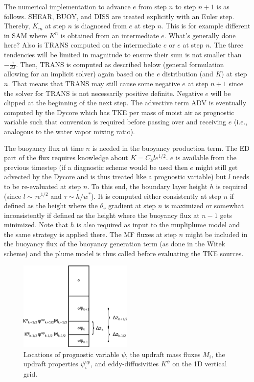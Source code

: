 \documentclass[dvipdfmx,a4paper,10pt]{article}
\begin{document}
The numerical implementation to advance $e$ from step $n$ to step $n+1$ is as follows. SHEAR, BUOY, and DISS are treated explicitly with an Euler step. Thereby, $K_m$ at step $n$ is diagnosed from $e$ at step $n$. {\color{blue} This is for example different in SAM where $K^n$ is obtained from an intermediate $e$. What's generally done here? Also is TRANS computed on the intermediate $e$ or $e$ at step $n$.} The three tendencies will be limited in magnitude to ensure their sum is not smaller than $-\frac{e}{\Delta t}$. Then, TRANS is computed as described below (general formulation allowing for an implicit solver) again based on the $e$ distribution (and $K$) at step $n$. That means that TRANS may still cause some negative $e$ at step $n+1$ since the solver for TRANS is not necessarily positive definite. Negative $e$ will be clipped at the beginning of the next step.  The advective term ADV is eventually computed by the Dycore which has TKE per mass of moist air as prognostic variable such that conversion is required before passing over and receiving $e$ (i.e., analogous to the water vapor mixing ratio). 

The buoyancy flux at time $n$ is needed in the buoyancy production term. The ED part of the flux requires knowledge about $K=C_k l e^{1/2}$. $e$ is available from the previous timestep (if a diagnostic scheme would be used then $e$ might still get advected by the Dycore and is thus treated like a prognostic variable) but $l$ needs to be re-evaluated at step $n$. To this end, the boundary layer height $h$ is required (since $l\sim \tau e^{1/2}$ and $\tau \sim h/w^*$). It is computed either consistently at step $n$ if defined as the height where the $\theta_v$ gradient at step $n$ is maximized or somewhat inconsistently if defined as the height where the buoyancy flux at $n-1$ gets minimized.  Note that $h$ is also required as input to the mupliplume model and the same strategy is applied there. The MF fluxes at step $n$ might be included in the buoyancy flux of the buoyancy generation term (as done in the Witek scheme) and the plume model is thus called before evaluating the TKE sources.


\begin{figure}[bthp]
\centering
 \includegraphics[width=0.5\textwidth]{staggering.eps}
\caption{Locations of prognostic variable $\psi$, the updraft mass fluxes $M_i$, the updraft properties $\psi^{up}_i$, and eddy-diffusivities $K^{\psi}$ on the 1D vertical grid. } \label{fig:staggering}
\end{figure}
\end{document}
